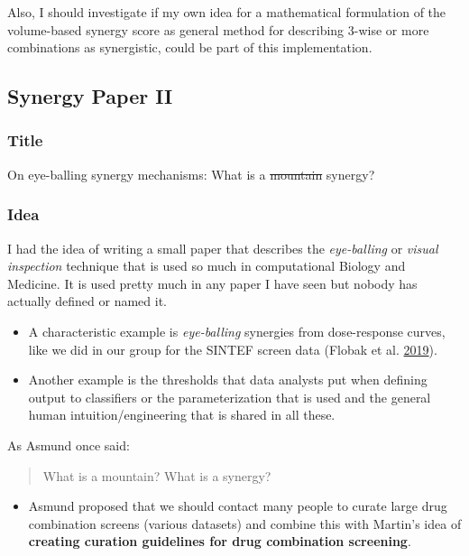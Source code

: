\documentclass[
  12pt,
]{book}
\providecommand{\tightlist}{%
  \setlength{\itemsep}{0pt}\setlength{\parskip}{0pt}}
\begin{document}
Also, I should investigate if my own idea for a mathematical formulation of the volume-based synergy score as general method for describing 3-wise or more combinations as synergistic, could be part of this implementation.

\hypertarget{synergy-paper-ii}{%
\subsection*{Synergy Paper II}\label{synergy-paper-ii}}

\hypertarget{title-1}{%
\subsubsection*{Title}\label{title-1}}

On eye-balling synergy mechanisms: What is a \sout{mountain} synergy?

\hypertarget{idea-2}{%
\subsubsection*{Idea}\label{idea-2}}

I had the idea of writing a small paper that describes the \emph{eye-balling} or \emph{visual inspection} technique that is used so much in computational Biology and Medicine.
It is used pretty much in any paper I have seen but nobody has actually defined or named it.

\begin{itemize}
\tightlist
\item
  A characteristic example is \emph{eye-balling} synergies from dose-response curves, like we did in our group for the SINTEF screen data (Flobak et al. \protect\hyperlink{ref-Flobak2019}{2019}).
\item
  Another example is the thresholds that data analysts put when defining output to classifiers or the parameterization that is used and the general human intuition/engineering that is shared in all these.
\end{itemize}

As Asmund once said:

\begin{quote}
What is a mountain? What is a synergy?
\end{quote}

\begin{itemize}
\tightlist
\item
  Asmund proposed that we should contact many people to curate large drug combination screens (various datasets) and combine this with Martin's idea of \textbf{creating curation guidelines for drug combination screening}.
\end{itemize}
\end{document}
